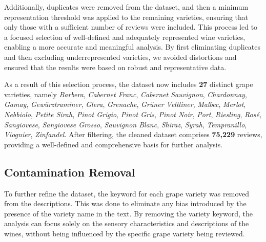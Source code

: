 Additionally, duplicates were removed from the dataset, 
and then a minimum representation threshold was applied 
to the remaining varieties, ensuring that only those 
with a sufficient number of reviews were included. 
This process led to a focused selection of 
well-defined and adequately represented wine varieties, 
enabling a more accurate and meaningful analysis. 
By first eliminating duplicates and then excluding 
underrepresented varieties, we avoided distortions and 
ensured that the results were based on robust and 
representative data.

As a result of this selection process, the dataset now 
includes \textbf{27} distinct grape varieties, namely 
\textit{Barbera}, \textit{Cabernet Franc}, \textit{Cabernet Sauvignon}, 
\textit{Chardonnay}, \textit{Gamay}, \textit{Gewürztraminer}, 
\textit{Glera}, \textit{Grenache}, \textit{Grüner Veltliner}, 
\textit{Malbec}, \textit{Merlot}, \textit{Nebbiolo}, 
\textit{Petite Sirah}, \textit{Pinot Grigio}, \textit{Pinot Gris}, 
\textit{Pinot Noir}, \textit{Port}, \textit{Riesling}, 
\textit{Rosé}, \textit{Sangiovese}, \textit{Sangiovese Grosso}, 
\textit{Sauvignon Blanc}, \textit{Shiraz}, \textit{Syrah}, 
\textit{Tempranillo}, \textit{Viognier}, \textit{Zinfandel}. 
After filtering, the cleaned dataset comprises \textbf{75,229} reviews, 
providing a well-defined and comprehensive basis for further analysis.

\subsection{Contamination Removal}
To further refine the dataset, the keyword for each
grape variety was removed from the descriptions. This
was done to eliminate any bias introduced by the
presence of the variety name in the text. By removing
the variety keyword, the analysis can focus solely on
the sensory characteristics and descriptions of the
wines, without being influenced by the specific grape
variety being reviewed.

